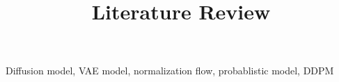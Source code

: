 
\begin{survey}
\label{cha:survey}

\title{Literature Review}
\maketitle



Diffusion model, VAE model, normalization flow, probablistic model, DDPM












\end{survey}
